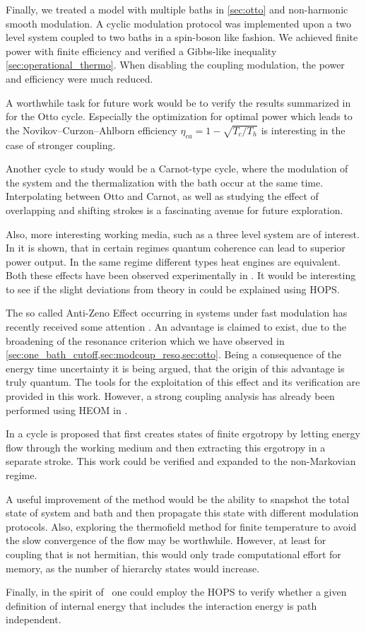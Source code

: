 Finally, we treated a model with multiple baths in \cref{sec:otto} and
non-harmonic smooth modulation. A cyclic modulation protocol was
implemented upon a two level system coupled to two baths in a
spin-boson like fashion. We achieved finite power with finite
efficiency and verified a Gibbs-like inequality
\cref{sec:operational_thermo}. When disabling the coupling modulation,
the power and efficiency were much reduced.

A worthwhile task for future work would be to verify the results
summarized in  for the Otto cycle. Especially the
optimization for optimal power which leads to the
Novikov–Curzon–Ahlborn efficiency \(η_{ca}=1-\sqrt{T_{c}/T_{h}}\) is
interesting in the case of stronger coupling.

Another cycle to study would be a Carnot-type cycle, where the
modulation of the system and the thermalization with the bath occur at
the same time. Interpolating between Otto and Carnot, as well as
studying the effect of overlapping and shifting strokes is a
fascinating avenue for future exploration.

Also, more interesting working media, such as a three level system are
of interest. In  it is shown, that in certain
regimes quantum coherence can lead to superior power output. In the
same regime different types heat engines are equivalent. Both these
effects have been observed experimentally in . It
would be interesting to see if the slight deviations from theory in
\cite{Klatzow2019Mar} could be explained using HOPS.

The so called Anti-Zeno Effect occurring in systems under fast
modulation has recently received some attention
\cite{Mukherjee2020Jan,Xu2022Mar}. An advantage is claimed to exist,
due to the broadening of the resonance criterion which we have
observed in
\cref{sec:one_bath_cutoff,sec:modcoup_reso,sec:otto}. Being a
consequence of the energy time uncertainty it is being argued, that
the origin of this advantage is truly quantum. The tools for the
exploitation of this effect and its verification are provided in this
work. However, a strong coupling analysis has already been performed
using HEOM in .

In  a cycle is proposed that first creates states
of finite ergotropy by letting energy flow through the working medium
and then extracting this ergotropy in a separate stroke. This work
could be verified and expanded to the non-Markovian regime.

A useful improvement of the method would be the ability to snapshot
the total state of system and bath and then propagate this state with
different modulation protocols. Also, exploring the thermofield method
for finite temperature to avoid the slow convergence of the flow may
be worthwhile. However, at least for coupling that is not hermitian,
this would only trade computational effort for memory, as the number
of hierarchy states would increase.

Finally, in the spirit of~\cite{Esposito2015Dec} one could employ the
HOPS to verify whether a given definition of internal energy that
includes the interaction energy is path independent.
